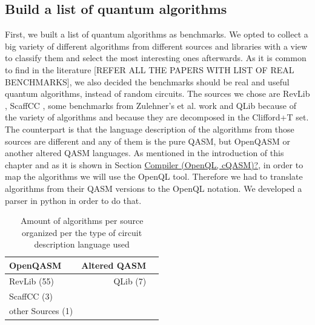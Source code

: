 \subsection*{Build a list of quantum algorithms}
\label{sec:orga5e2946}

First, we built a list of quantum algorithms as benchmarks.
We opted to collect a big variety of different algorithms from different sources and libraries with a view to classify them and select the most interesting ones afterwards.
As it is common to find in the literature [REFER ALL THE PAPERS WITH LIST OF REAL BENCHMARKS], we also decided the benchmarks should be real and useful quantum algorithms, instead of random circuits.
The sources we chose are RevLib \cite{Wille_2008}, ScaffCC \cite{JavadiAbhari_2015}, some benchmarks from Zulehner's et al. work \cite{zulehner17:effic_method_mappin_quant_circuit} and QLib \cite{Lin_2014} because of the variety of algorithms and because they are decomposed in the Clifford+T set.
The counterpart is that the language description of the algorithms from those sources are different and any of them is the pure QASM, but OpenQASM or another altered QASM languages.
As mentioned in the introduction of this chapter and as it is shown in Section \hyperref[sec:org06f6c35]{Compiler (OpenQL, cQASM)?}, in order to map the algorithms we will use the OpenQL tool.
Therefore we had to translate algorithms from their QASM versions to the OpenQL notation.
We developed a parser in python in order to do that.

\begin{table}[htbp]
\caption{\label{tab:org23ee81b}
Amount of algorithms per source organized per the type of circuit description language used}
\centering
\begin{tabular}{lrr}
\hline
OpenQASM & Altered QASM\\
\hline
RevLib (55) & QLib (7)\\
ScaffCC (3) & \\
other Sources (1) & \\
\hline
\end{tabular}
\end{table}

